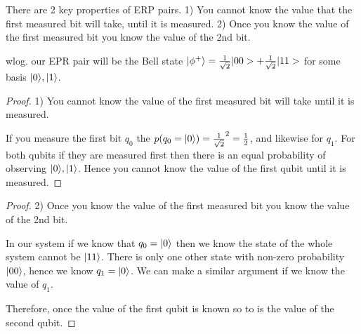 There are 2 key properties of ERP pairs.
1) You cannot know the value that the first measured bit will take, until it is measured.
2) Once you know the value of the first measured bit you know the value of the 2nd bit.

wlog. our EPR pair will be the Bell state $\lvert\phi^+\rangle= \frac{1}{\sqrt{2}}|00> + \frac{1}{\sqrt{2}}|11> $ for some basis $\lvert0\rangle, \lvert1\rangle$.

\begin{proof} 1) You cannot know the value of the first measured bit will take until it is measured.

    If you measure the first bit $q_0$ the $p(q_0=\lvert0\rangle) = \frac{1}{\sqrt{2}}^2 = \frac{1}{2}$, and likewise for $q_1$.
    For both qubits if they are measured first then there is an equal probability of observing $\lvert0\rangle, \lvert1\rangle$.
    Hence you cannot know the value of the first qubit until it is measured.
\end{proof}

\begin{proof} 2) Once you know the value of the first measured bit you know the value of the 2nd bit.

In our system if we know that $q_0=\lvert0\rangle$ then we know the state of the whole system cannot be $\lvert11\rangle$.
There is only one other state with non-zero probability $\lvert00\rangle$, hence we know $q_1=\lvert0\rangle$.
We can make a similar argument if we know the value of $q_1$.

Therefore, once the value of the first qubit is known so to is the value of the second qubit.
\end{proof}




